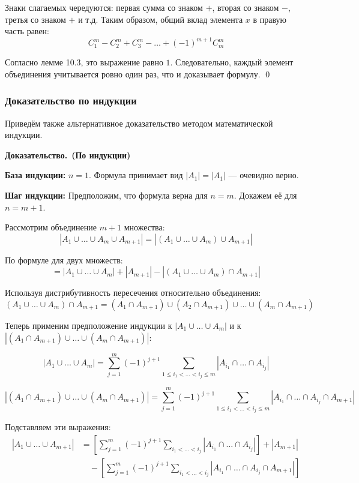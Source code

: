 \documentclass[a4paper,12pt]{article}
\newcommand{\myproof}{\textbf{Доказательство.}\ }
\begin{document}
	Знаки слагаемых чередуются: первая сумма со знаком $+$, вторая со знаком $-$, третья со знаком $+$ и т.д. Таким образом, общий вклад элемента $x$ в правую часть равен:
	\[ C_1^m - C_2^m + C_3^m - \dots + (-1)^{m+1} C_m^m \]
	
	Согласно лемме 10.3, это выражение равно $1$. Следовательно, каждый элемент объединения учитывается ровно один раз, что и доказывает формулу. \qed
	
	\subsubsection{Доказательство по индукции}
	
	Приведём также альтернативное доказательство методом математической индукции.
	
	\myproof \textbf{(По индукции)}
	
	\textbf{База индукции:} $n = 1$. Формула принимает вид $|A_1| = |A_1|$ — очевидно верно.
	
	\textbf{Шаг индукции:} Предположим, что формула верна для $n = m$. Докажем её для $n = m+1$.
	
	Рассмотрим объединение $m+1$ множества:
	\[ |A_1 \cup \dots \cup A_m \cup A_{m+1}| = |(A_1 \cup \dots \cup A_m) \cup A_{m+1}| \]
	
	По формуле для двух множеств:
	\[ = |A_1 \cup \dots \cup A_m| + |A_{m+1}| - |(A_1 \cup \dots \cup A_m) \cap A_{m+1}| \]
	
	Используя дистрибутивность пересечения относительно объединения:
	\[ (A_1 \cup \dots \cup A_m) \cap A_{m+1} = (A_1 \cap A_{m+1}) \cup (A_2 \cap A_{m+1}) \cup \dots \cup (A_m \cap A_{m+1}) \]
	
	Теперь применим предположение индукции к $|A_1 \cup \dots \cup A_m|$ и к $|(A_1 \cap A_{m+1}) \cup \dots \cup (A_m \cap A_{m+1})|$:
	
	\[ |A_1 \cup \dots \cup A_m| = \sum_{j=1}^m (-1)^{j+1} \sum_{1 \le i_1 < \dots < i_j \le m} |A_{i_1} \cap \dots \cap A_{i_j}| \]
	
	\[ |(A_1 \cap A_{m+1}) \cup \dots \cup (A_m \cap A_{m+1})| = \sum_{j=1}^m (-1)^{j+1} \sum_{1 \le i_1 < \dots < i_j \le m} |A_{i_1} \cap \dots \cap A_{i_j} \cap A_{m+1}| \]
	
	Подставляем эти выражения:
	\begin{align*}
		|A_1 \cup \dots \cup A_{m+1}| &= \left[ \sum_{j=1}^m (-1)^{j+1} \sum_{i_1<\dots<i_j} |A_{i_1} \cap \dots \cap A_{i_j}| \right] + |A_{m+1}| \\
		&\quad - \left[ \sum_{j=1}^m (-1)^{j+1} \sum_{i_1<\dots<i_j} |A_{i_1} \cap \dots \cap A_{i_j} \cap A_{m+1}| \right]
	\end{align*}
	
\end{document}
